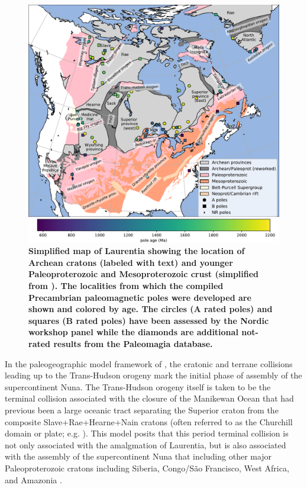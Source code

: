 \documentclass[11pt,letterpaper]{article}
\begin{document}
\begin{figure}
\centering
\includegraphics[width=\textwidth]{Figures/Fig1_map.pdf}
\caption{\small{\textbf{Simplified map of Laurentia showing the location of Archean cratons (labeled with text) and younger Paleoproterozoic and Mesoproterozoic crust (simplified from \cite{Whitmeyer2007a}). The localities from which the compiled Precambrian paleomagnetic poles were developed are shown and colored by age. The circles (A rated poles) and squares (B rated poles) have been assessed by the Nordic workshop panel while the diamonds are additional not-rated results from the Paleomagia database.}}}
\label{fig:Laurentia_map}
\end{figure} 

In the paleogeographic model framework of \cite{Pehrsson2015a}, the cratonic and terrane collisions leading up to the Trans-Hudson orogeny mark the initial phase of assembly of the supercontinent Nuna. The Trans-Hudson orogeny itself is taken to be the terminal collision associated with the closure of the Manikewan Ocean that had previous been a large oceanic tract separating the Superior craton from the composite Slave+Rae+Hearne+Nain cratons (often referred to as the Churchill domain or plate; e.g. \citealp{Skipton2016a, Weller2017a}). This model posits that this period terminal collision is not only associated with the amalgmation of Laurentia, but is also associated with the assembly of the supercontinent Nuna that including other major Paleoproterozoic cratons including Siberia, Congo/S\~ao Francisco, West Africa, and Amazonia \citep{Pehrsson2015a}. 
\end{document}
